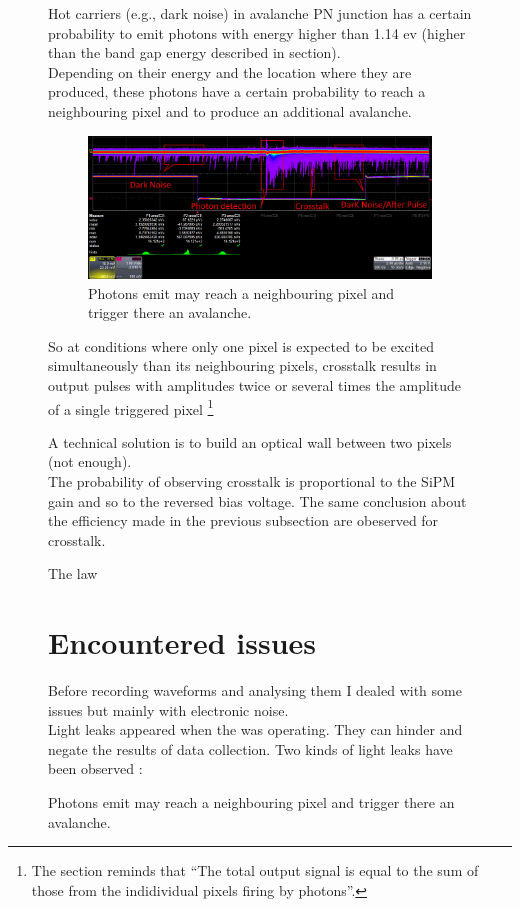 \begin{figure}[!hbtp]
  Hot carriers (e.g., dark noise) in avalanche PN junction has a certain probability to emit photons with energy higher than 1.14 ev (higher than 
  the band gap energy described in section).\\
  Depending on their energy and the location where they are produced, these photons have a certain probability to reach a 
  neighbouring pixel and to produce an additional avalanche. 
  
  \begin{figure}[!hbtp]
  \centering
  \includegraphics[totalheight=0.22\textwidth,trim=0cm 6.5cm 0cm 0cm, clip=true]{Pictures/blabla/DN_AP_CT_1.png}
  \caption{Photons emit may reach a neighbouring pixel and trigger there an avalanche.}
  \label{fig:CT}
  \end{figure}
  
  So at conditions where only one pixel is expected to be excited simultaneously than its neighbouring pixels, crosstalk results in output 
  pulses with amplitudes twice or several times the amplitude of a single triggered pixel
  \footnote{The section\label{Basic operation} reminds that ``The total output signal is equal to the sum of those from the indidividual 
  pixels firing by photons''.}
  
  A technical solution is to build an optical wall between two pixels (not enough). 
  \\
  
  The probability of observing crosstalk is proportional to the SiPM gain and so to the reversed bias voltage. The same conclusion about the 
  efficiency made in the previous subsection are obeserved for crosstalk. 
  
  The law
  
  
  \section{Encountered issues}  
  
  Before recording waveforms and analysing them I dealed with some issues but mainly with electronic noise.\\
  Light leaks appeared when the \xfl was operating. They can hinder and negate the results of data collection. 
  Two kinds of light leaks have been observed :
  

\end{figure}
